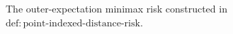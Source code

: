 The outer-expectation minimax risk constructed in \(\mathrm{def:point\text{-}indexed\text{-}distance\text{-}risk}\).